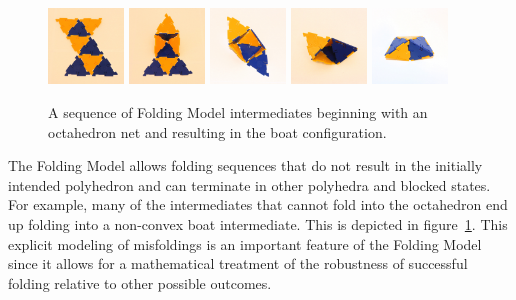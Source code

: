 \begin{figure}[h]

       \centering

                \includegraphics[width=0.18\textwidth]{images/folds_0.eps}
                \includegraphics[width=0.18\textwidth]{images/folds_1.eps}
                \includegraphics[width=0.18\textwidth]{images/folds_2.eps}
                \includegraphics[width=0.18\textwidth]{images/folds_3B.eps}
                \includegraphics[width=0.18\textwidth]{images/folds_4B.eps}


\caption{A sequence of Folding Model intermediates beginning with an octahedron net and resulting in the boat configuration.}
\label{fig:fold_boat}
\end{figure}

The Folding Model allows folding sequences that do not result in the initially intended polyhedron and can terminate in other polyhedra and blocked states. For example, many of the intermediates that cannot fold into the octahedron end up folding into a non-convex boat intermediate. This is depicted in figure~\ref{fig:fold_boat}. This explicit modeling of misfoldings is an important feature of the Folding Model since it allows for a mathematical treatment of the robustness of successful folding relative to other possible outcomes. 

